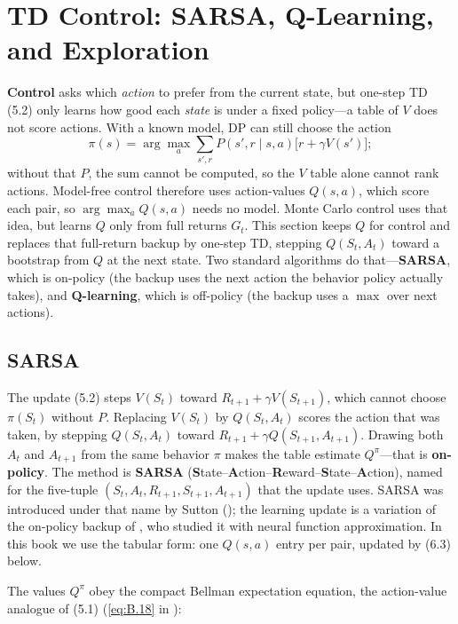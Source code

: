 \chapter{TD Control: SARSA, Q-Learning, and Exploration}

\textbf{Control} asks which \textit{action} to prefer from the current state, but one-step TD (5.2) only learns how good each \textit{state} is under a fixed policy---a table of $V$ does not score actions. With a known model, DP can still choose the action
\[
\pi(s)=\arg\max_a\sum_{s',r}P(s',r\mid s,a)\bigl[r+\gamma V(s')\bigr];
\]
without that $P$, the sum cannot be computed, so the $V$ table alone cannot rank actions. Model-free control therefore uses action-values $Q(s,a)$, which score each pair, so $\arg\max_a Q(s,a)$ needs no model. Monte Carlo control uses that idea, but learns $Q$ only from full returns $G_t$. This section keeps $Q$ for control and replaces that full-return backup by one-step TD, stepping $Q(S_t,A_t)$ toward a bootstrap from $Q$ at the next state. Two standard algorithms do that---\textbf{SARSA}, which is on-policy (the backup uses the next action the behavior policy actually takes), and \textbf{Q-learning}, which is off-policy (the backup uses a $\max$ over next actions).

\section{SARSA}

The update (5.2) steps $V(S_t)$ toward $R_{t+1}+\gamma V(S_{t+1})$, which cannot choose $\pi(S_t)$ without $P$. Replacing $V(S_t)$ by $Q(S_t,A_t)$ scores the action that was taken, by stepping $Q(S_t,A_t)$ toward $R_{t+1}+\gamma Q(S_{t+1},A_{t+1})$. Drawing both $A_t$ and $A_{t+1}$ from the same behavior $\pi$ makes the table estimate $Q^\pi$---that is \textbf{on-policy}. The method is \textbf{SARSA} (\textbf{S}tate--\textbf{A}ction--\textbf{R}eward--\textbf{S}tate--\textbf{A}ction), named for the five-tuple $(S_t,A_t,R_{t+1},S_{t+1},A_{t+1})$ that the update uses. SARSA was introduced under that name by Sutton (); the learning update is a variation of the on-policy backup of , who studied it with neural function approximation. In this book we use the tabular form: one $Q(s,a)$ entry per pair, updated by (6.3) below.

The values $Q^\pi$ obey the compact Bellman expectation equation, the action-value analogue of (5.1) (\eqref{eq:B.18} in ):

